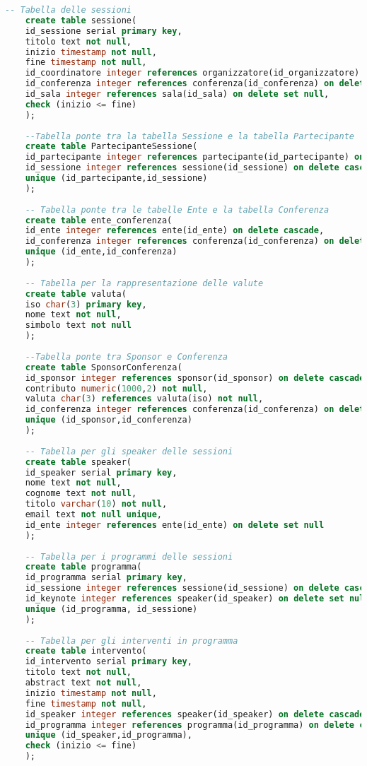 \begin{lstlisting}[language=SQL, style=mystyle]
	-- Tabella delle sessioni
	create table sessione(
	id_sessione serial primary key,
	titolo text not null,
	inizio timestamp not null,
	fine timestamp not null,
	id_coordinatore integer references organizzatore(id_organizzatore) on delete set null,
	id_conferenza integer references conferenza(id_conferenza) on delete cascade,
	id_sala integer references sala(id_sala) on delete set null,
	check (inizio <= fine)
	);
	
	--Tabella ponte tra la tabella Sessione e la tabella Partecipante
	create table PartecipanteSessione(
	id_partecipante integer references partecipante(id_partecipante) on delete cascade,
	id_sessione integer references sessione(id_sessione) on delete cascade,
	unique (id_partecipante,id_sessione)
	);
	
	-- Tabella ponte tra le tabelle Ente e la tabella Conferenza
	create table ente_conferenza(
	id_ente integer references ente(id_ente) on delete cascade,
	id_conferenza integer references conferenza(id_conferenza) on delete cascade,
	unique (id_ente,id_conferenza)
	);
	
	-- Tabella per la rappresentazione delle valute
	create table valuta(
	iso char(3) primary key,
	nome text not null,
	simbolo text not null
	);
	
	--Tabella ponte tra Sponsor e Conferenza
	create table SponsorConferenza(
	id_sponsor integer references sponsor(id_sponsor) on delete cascade,
	contributo numeric(1000,2) not null,
	valuta char(3) references valuta(iso) not null,
	id_conferenza integer references conferenza(id_conferenza) on delete cascade,
	unique (id_sponsor,id_conferenza)
	);
	
	-- Tabella per gli speaker delle sessioni
	create table speaker(
	id_speaker serial primary key,
	nome text not null,
	cognome text not null,
	titolo varchar(10) not null,
	email text not null unique,
	id_ente integer references ente(id_ente) on delete set null
	);
	
	-- Tabella per i programmi delle sessioni
	create table programma(
	id_programma serial primary key,
	id_sessione integer references sessione(id_sessione) on delete cascade,
	id_keynote integer references speaker(id_speaker) on delete set null,
	unique (id_programma, id_sessione)
	);
	
	-- Tabella per gli interventi in programma
	create table intervento(
	id_intervento serial primary key,
	titolo text not null,
	abstract text not null,
	inizio timestamp not null,
	fine timestamp not null,
	id_speaker integer references speaker(id_speaker) on delete cascade,
	id_programma integer references programma(id_programma) on delete cascade,
	unique (id_speaker,id_programma),
	check (inizio <= fine)
	);
	

\end{lstlisting}
